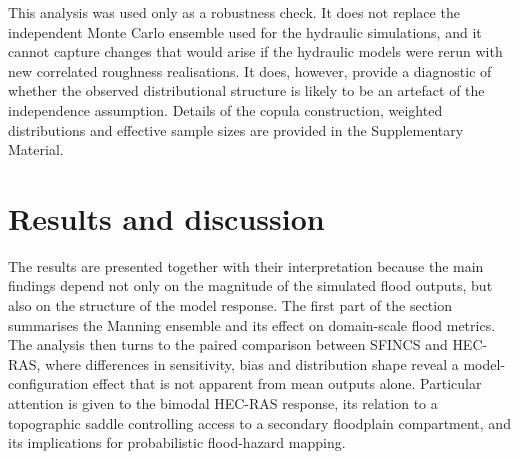 \documentclass[a4paper,fleqn]{cas-sc}
\newcommand{\sfincs}{\textsc{SFINCS}}
\newcommand{\hecras}{\textsc{HEC-RAS}}
\begin{document}
This analysis was used only as a robustness check. It does not replace the independent Monte Carlo ensemble used for the hydraulic simulations, and it cannot capture changes that would arise if the hydraulic models were rerun with new correlated roughness realisations. It does, however, provide a diagnostic of whether the observed distributional structure is likely to be an artefact of the independence assumption. Details of the copula construction, weighted distributions and effective sample sizes are provided in the Supplementary Material.

\section{Results and discussion}\label{sec:results_discussion}
The results are presented together with their interpretation because the main findings depend not only on the magnitude of the simulated flood outputs, but also on the structure of the model response. The first part of the section summarises the Manning ensemble and its effect on domain-scale flood metrics. The analysis then turns to the paired comparison between \sfincs{} and \hecras{}, where differences in sensitivity, bias and distribution shape reveal a model-configuration effect that is not apparent from mean outputs alone. Particular attention is given to the bimodal \hecras{} response, its relation to a topographic saddle controlling access to a secondary floodplain compartment, and its implications for probabilistic flood-hazard mapping.
\end{document}
